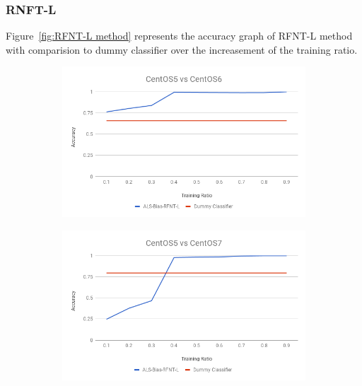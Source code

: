 \documentclass[10pt, conference, compsocconf]{IEEEtran}
\begin{document}
\subsubsection{RNFT-L}
Figure~\ref{fig:RFNT-L method} represents
the accuracy graph of RFNT-L method with comparision to dummy
classifier over the increasement of the training ratio.
\begin{figure}[h!]
        \centering
        \begin{subfigure}[b]{0.8\linewidth}
                \includegraphics[width=\columnwidth]{figures/ALS-Bias/RFNT-L-ALS-Bias-5vs6-PFS}
        \end{subfigure}
        \begin{subfigure}[b]{0.8\linewidth}
                \includegraphics[width=\columnwidth]{figures/ALS-Bias/RFNT-L-ALS-Bias-5vs7-PFS}
        \end{subfigure}
        \begin{subfigure}[b]{0.8\linewidth}

\end{subfigure}
\end{figure}
\end{document}
